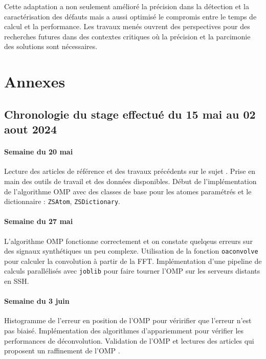 \documentclass[9pt,a4paper,twoside]{rho}
\begin{document}
Cette adaptation a non seulement amélioré la précision dans la détection et la caractérisation des défauts mais a aussi optimisé le compromis entre le temps de calcul et la performance. Les travaux menés ouvrent des perspectives pour des recherches futures dans des contextes critiques où la précision et la parcimonie des solutions sont nécessaires.

\section{Annexes}   

\subsection{Chronologie du stage effectué du 15 mai au 02 aout 2024}

\paragraph{Semaine du 20 mai}
Lecture des articles de référence et des travaux précédents sur le sujet \cite{orthogonal_matching_pursuit, localized_defects_omp, broken_wire}. Prise en main des outils de travail et des données disponibles. Début de l'implémentation de l'algorithme OMP avec des classes de base pour les atomes paramétrés et le dictionnaire : \texttt{ZSAtom}, \texttt{ZSDictionary}.

\paragraph{Semaine du 27 mai}
L'algorithme OMP fonctionne correctement et on constate quelqeus erreurs sur des signaux synthétiques un peu complexe. Utilisation de la fonction \texttt{oaconvolve} pour calculer la convolution à partir de la FFT. Implémentation d'une pipeline de calculs parallélisés avec \texttt{joblib} pour faire tourner l'OMP sur les serveurs distants en SSH.

\paragraph{Semaine du 3 juin}
Histogramme de l'erreur en position de l'OMP pour véririfier que l'erreur n'est pas biaisé.
Implémentation des algorithmes d'appariemment pour vérifier les performances de déconvolution.
Validation de l'OMP et lectures des articles qui proposent un raffinement de l'OMP \cite{swapping_based_refinement_omp, random_refined_omp, multipath_matching_pursuit}.
\end{document}
